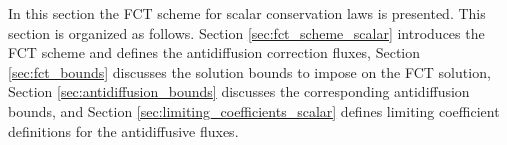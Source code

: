 In this section the FCT scheme for scalar conservation laws is presented.
This section is organized as follows. Section \ref{sec:fct_scheme_scalar}
introduces the FCT scheme and defines the antidiffusion correction fluxes,
Section \ref{sec:fct_bounds} discusses the solution bounds to impose on
the FCT solution, Section \ref{sec:antidiffusion_bounds} discusses the
corresponding antidiffusion bounds, and Section
\ref{sec:limiting_coefficients_scalar} defines limiting coefficient
definitions for the antidiffusive fluxes.
